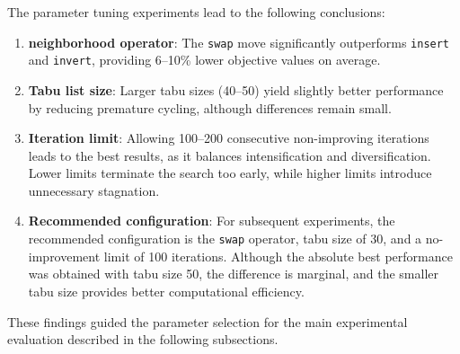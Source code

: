 
The parameter tuning experiments lead to the following conclusions:

\begin{enumerate}
    \item \textbf{neighborhood operator}: The \texttt{swap} move significantly outperforms \texttt{insert} and \texttt{invert}, providing 6--10\% lower objective values on average.

    \item \textbf{Tabu list size}: Larger tabu sizes (40--50) yield slightly better performance by reducing premature cycling, although differences remain small.

    \item \textbf{Iteration limit}: Allowing 100--200 consecutive non-improving iterations leads to the best results, as it balances intensification and diversification. Lower limits terminate the search too early, while higher limits introduce unnecessary stagnation.

    \item \textbf{Recommended configuration}: For subsequent experiments, the recommended configuration is the \texttt{swap} operator, tabu size of 30, and a no-improvement limit of 100 iterations. Although the absolute best performance was obtained with tabu size 50, the difference is marginal, and the smaller tabu size provides better computational efficiency.
\end{enumerate}

These findings guided the parameter selection for the main experimental evaluation described in the following subsections.
